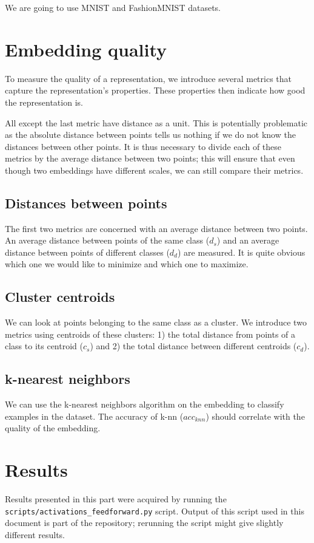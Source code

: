 \documentclass{article}
\begin{document}
We are going to use MNIST and FashionMNIST datasets.

\section{Embedding quality}
To measure the quality of a representation, we introduce several metrics that
capture the representation's properties. These properties then indicate how
good the representation is.

All except the last metric have distance as a unit. This is potentially
problematic as the absolute distance between points tells us nothing if we
do not know the distances between other points. It is thus necessary
to divide each of these metrics by the average distance between two points;
this will ensure that even though two embeddings have different scales, we
can still compare their metrics.

\subsection{Distances between points}
The first two metrics are concerned with an average distance between two points.
An average distance between points of the same class (\(d_s\)) and an average
distance between points of different classes (\(d_d\)) are measured. It is
quite obvious which one we would like to minimize and which one to maximize.

\subsection{Cluster centroids}
We can look at points belonging to the same class as a cluster. We introduce
two metrics using centroids of these clusters: 1) the total distance from 
points of a class to its centroid (\(c_s\)) and 2) the total distance between
different centroids (\(c_d\)).

\subsection{k-nearest neighbors}
We can use the k-nearest neighbors algorithm on the embedding to classify
examples in the dataset. The accuracy of k-nn (\(acc_{knn}\)) should
correlate with the quality of the embedding.

\section{Results}
Results presented in this part were acquired by running the
\texttt{\\ scripts/activations\_feedforward.py} script. Output of this script
used in this document is part of the repository; rerunning the script might
give slightly different results.
\end{document}
